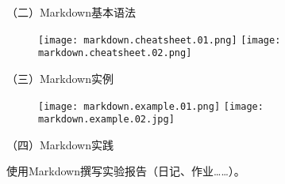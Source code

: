 \vspace{0.1in}
（二）Markdown基本语法
\begin{figure}[h]
  \centering
  \texttt{[image: markdown.cheatsheet.01.png]}
  \texttt{[image: markdown.cheatsheet.02.png]}
\end{figure}

\vspace{0.1in}
（三）Markdown实例
\begin{figure}[h]
  \centering
  \texttt{[image: markdown.example.01.png]}
  \texttt{[image: markdown.example.02.jpg]}
\end{figure}

\vspace{0.1in}
（四）Markdown实践

使用Markdown撰写实验报告（日记、作业……）。
